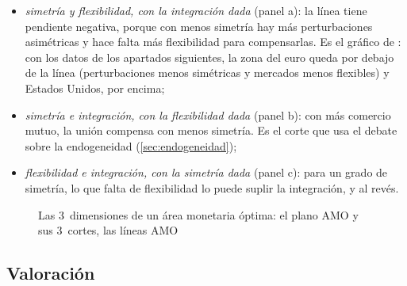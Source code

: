 \documentclass[11pt]{article}
\begin{document}
\begin{itemize}
  \begin{itemize}
  \item \emph{simetría y flexibilidad, con la integración dada} (panel a): la línea tiene pendiente negativa, porque con menos simetría hay más perturbaciones asimétricas y hace falta más flexibilidad para compensarlas. Es el gráfico de \textcite{DeGrauwe2022Economics}: con los datos de los apartados siguientes, la zona del euro queda por debajo de la línea (perturbaciones menos simétricas y mercados menos flexibles) y Estados Unidos, por encima;
  \item \emph{simetría e integración, con la flexibilidad dada} (panel b): con más comercio mutuo, la unión compensa con menos simetría. Es el corte que usa el debate sobre la endogeneidad (\ref{sec:endogeneidad});
  \item \emph{flexibilidad e integración, con la simetría dada} (panel c): para un grado de simetría, lo que falta de flexibilidad lo puede suplir la integración, y al revés.
  \end{itemize}
\end{itemize}

\begin{figure}[H]
\centering
\caption{Las 3~dimensiones de un área monetaria óptima: el plano AMO y sus 3~cortes, las líneas AMO}\label{fig:amo-dimensiones}
\end{figure}

\subsection{Valoración}\label{sec:valoracion-amo}
\end{document}
